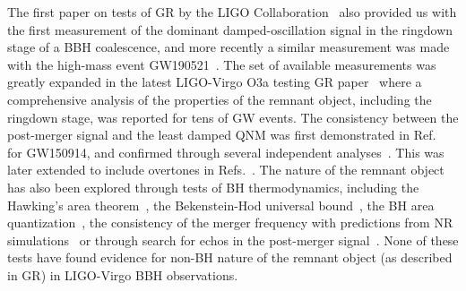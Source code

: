 \documentclass[twocolumn,prd,aps,superscriptaddress,preprintnumbers,tightenlines,showpacs,nofootinbib,eqsecnum,amsfonts,amsmath]{revtex4-1}
\begin{document}
The first paper on tests of GR by the LIGO Collaboration~\cite{TheLIGOScientific:2016src} also provided us with the first measurement of the dominant damped-oscillation signal in the ringdown stage of a BBH
coalescence, and more recently a similar measurement was made with the high-mass event GW190521~\cite{Abbott:2020tfl,Abbott:2020mjq}. The set of available measurements was greatly expanded in the latest LIGO-Virgo O3a testing GR paper~\cite{Abbott:2020jks} where a comprehensive analysis of the properties of the remnant object, including the ringdown stage, was reported for tens of GW events. The consistency between the post-merger signal and the least damped QNM was first demonstrated in
Ref.~\cite{TheLIGOScientific:2016src} for GW150914, and confirmed through several independent analyses~\cite{Brito:2018rfr,Carullo:2019flw,Isi:2019aib,CalderonBustillo:2020tjf}. This was later extended to include
overtones in Refs.~\cite{Giesler:2019uxc,Isi:2019aib,Abbott:2020jks}.  The nature of the remnant object has also been explored through tests of BH thermodynamics, including the Hawking's area
theorem~\cite{Cabero:2017avf,Isi:2020tac}, the Bekenstein-Hod universal bound~\cite{Carullo:2021yxh}, the BH area quantization~\cite{Foit:2016uxn,Laghi:2020rgl}, the consistency of the merger frequency with predictions from NR simulations~\cite{Carullo:2018gah} or through search for echos in the post-merger signal~\cite{Nielsen:2018lkf,Tsang:2019zra,Lo:2018sep,Abedi:2018npz,Abedi:2020sgg,Testa:2018bzd}.  None of these tests have found evidence for non-BH nature of the remnant
object (as described in GR) in LIGO-Virgo BBH observations.
\end{document}

